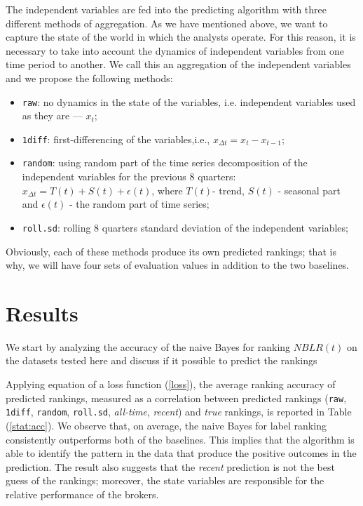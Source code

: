 \documentclass{article}\usepackage[]{graphicx}\usepackage[]{color}
\newcommand{\tr}{\textit{true}}
\newcommand{\naive}{\textit{recent}}
\newcommand{\default}{\textit{all-time}}
\newcommand{\raw}{\texttt{raw}}
\newcommand{\diff}{\texttt{1diff}}
\newcommand{\random}{\texttt{random}}
\newcommand{\rollsd}{\texttt{roll.sd}}
\begin{document}
The independent variables are fed into the predicting algorithm with three different methods of aggregation. As we have mentioned above, we want to capture the state of the world in which the analysts operate. For this reason, it is necessary to take into account the dynamics of independent variables from one time period to another. We call this an aggregation of the independent variables and we propose the following methods:
\singlespace
\begin{itemize}
\item \raw: no dynamics in the state of the  variables, i.e. independent variables used as they are --- $x_t$;
\item  \diff: first-differencing  of the variables,i.e., $x_{\Delta{t}}=x_t-x_{t-1}$;
\item  \random: using random part of the time series decomposition of the independent variables for the previous 8 quarters: $x_{\Delta{t}}=T(t)+S(t)+\epsilon (t)$, where $T(t)$- trend, $S(t)$ - seasonal part and $\epsilon (t)$ - the random part of time series; 
\item  \rollsd: rolling 8 quarters standard deviation of the independent variables;
\end{itemize}
\doublespace
Obviously, each of these methods produce its own predicted rankings; that is why, we will have four sets of evaluation values in addition to the two baselines.





\section{Results}
\label{sec:results}

%

We start by analyzing the accuracy of the naive Bayes for ranking  $NBLR(t)$ on  the datasets tested here and discuss if it possible to predict the rankings

Applying equation of a loss function (\ref{loss}), the average ranking accuracy of  predicted rankings, measured as a correlation between predicted rankings (\raw{}, \diff{}, \random{}, \rollsd{}, \default{}, \naive{}) and \tr{} rankings,  is reported in Table (\ref{stat:acc}). We observe that, on average, the naive Bayes for label ranking consistently outperforms both of the baselines. This implies that the algorithm is able to identify the pattern in the data that produce the positive outcomes in the prediction. The result also suggests that the \naive{} prediction is not the best guess of the rankings;  moreover,  the state variables are responsible for the relative performance of the brokers. 
\end{document}
